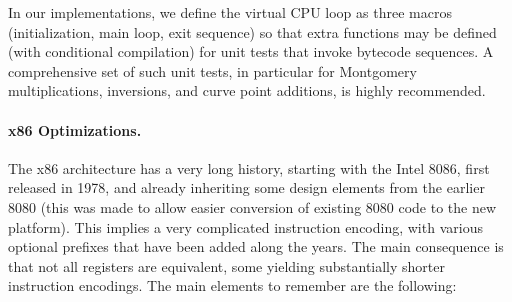 \documentclass{llncs}
\begin{document}
In our implementations, we define the virtual CPU loop as three macros
(initialization, main loop, exit sequence) so that extra functions may
be defined (with conditional compilation) for unit tests that invoke
bytecode sequences. A comprehensive set of such unit tests, in
particular for Montgomery multiplications, inversions, and curve point
additions, is highly recommended.

\paragraph{x86 Optimizations.}
The x86 architecture has a very long history, starting with the Intel
8086, first released in 1978, and already inheriting some design
elements from the earlier 8080 (this was made to allow easier conversion
of existing 8080 code to the new platform). This implies a very
complicated instruction encoding, with various optional prefixes that
have been added along the years. The main consequence is that not all
registers are equivalent, some yielding substantially shorter instruction
encodings. The main elements to remember are the following:
\end{document}
